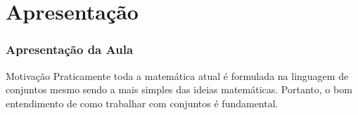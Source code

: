 \section{Apresentação}


\begin{frame}
    \frametitle{Apresentação da Aula}
    
    \begin{block}{Motivação}
        Praticamente toda a matemática atual é formulada na linguagem de conjuntos mesmo sendo a mais simples das ideias matemáticas. Portanto, o bom entendimento de como trabalhar com conjuntos é fundamental.
    \end{block}
\end{frame}
